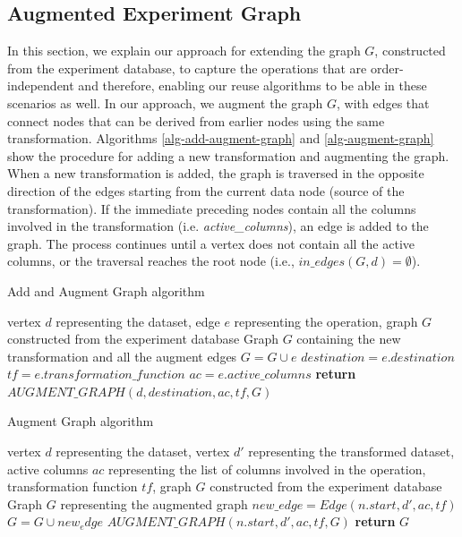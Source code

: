 \subsection{Augmented Experiment Graph}
In this section, we explain our approach for extending the graph $G$, constructed from the experiment database, to capture the operations that are order-independent and therefore, enabling our reuse algorithms to be able in these scenarios as well.
In our approach, we augment the graph $G$, with edges that connect nodes that can be derived from earlier nodes using the same transformation.
Algorithms \ref{alg-add-augment-graph} and \ref{alg-augment-graph} show the procedure for adding a new transformation and augmenting the graph.
When a new transformation is added, the graph is traversed in the opposite direction of the edges starting from the current data node (source of the transformation).
If the immediate preceding nodes contain all the columns involved in the transformation (i.e. \textit{active\_columns}), an edge is added to the graph.
The process continues until a vertex does not contain all the active columns, or the traversal reaches the root node (i.e., $in\_edges(G,d) = \emptyset$).

\begin{algorithm}
\caption{Add and Augment Graph algorithm}\label{alg-add-augment-graph}
\begin{algorithmic}[1]
\Require vertex $d$ representing the dataset, edge $e$ representing the operation, graph $G$ constructed from the experiment database
\Ensure Graph $G$ containing the new transformation and all the augment edges
	\State $G = G \cup e$ 
	\State $destination = e.destination$ 
	\State $tf=e.transformation\_function$ 
	\State $ac=e.active\_columns$ 
	\State \textbf{return} $AUGMENT\_GRAPH(d, destination,ac, tf, G)$   
\EndFunction
\end{algorithmic}
\end{algorithm}

\begin{algorithm}
\caption{Augment Graph algorithm}\label{alg-augment-graph}
\begin{algorithmic}[1]
\Require vertex $d$ representing the dataset, vertex $d'$ representing the transformed dataset, active columns $ac$ representing the list of columns involved in the operation, transformation function $tf$, graph $G$ constructed from the experiment database
\Ensure Graph $G$ representing the augmented graph
			\State  $new\_edge=Edge(n.start, d', ac,tf)$
			\State $G = G \cup new_edge$
			\State  $AUGMENT\_GRAPH(n.start, d',ac, tf,G)$
		\EndIf
	\EndFor
   \State \textbf{return} $G$
\EndFunction
\end{algorithmic}
\end{algorithm}


